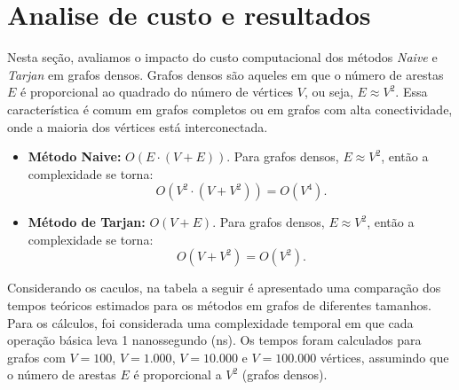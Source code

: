 \documentclass{sbc2023}%
\begin{document}
\section{Analise de custo e resultados}

Nesta seção, avaliamos o impacto do custo computacional dos métodos \textit{Naive} e \textit{Tarjan} em grafos densos. Grafos densos são aqueles em que o número de arestas $E$ é proporcional ao quadrado do número de vértices $V$, ou seja, 
$ E \approx V^2. $
Essa característica é comum em grafos completos ou em grafos com alta conectividade, onde a maioria dos vértices está interconectada.


\begin{itemize}
    \item\textbf{Método Naive:} \( O(E \cdot (V + E)) \). Para grafos densos, \( E \approx V^2 \), então a complexidade se torna: \[O(V^2 \cdot (V + V^2)) = O(V^4).\]

    \item\textbf{Método de Tarjan:} \( O(V + E) \). Para grafos densos, \( E \approx V^2 \), então a complexidade se torna:\[O(V + V^2) = O(V^2).\]
\end{itemize}

Considerando os caculos, na tabela a seguir é apresentado uma comparação dos tempos teóricos estimados para os métodos em grafos de diferentes tamanhos. Para os cálculos, foi considerada uma complexidade temporal em que cada operação básica leva 1 nanossegundo (ns). Os tempos foram calculados para grafos com \( V = 100 \), \( V = 1.000 \), \( V = 10.000 \) e \( V = 100.000 \) vértices, assumindo que o número de arestas \( E \) é proporcional a \( V^2 \) (grafos densos).


\begin{table}[h]
    \centering
    \label{tab:comparacao}
    \small %
    \renewcommand{\arraystretch}{1.2} %
    \setlength{\tabcolsep}{5pt} %
     \caption{Tempos teóricos de Naive e Tarjan.}
\end{table}
\end{document}
